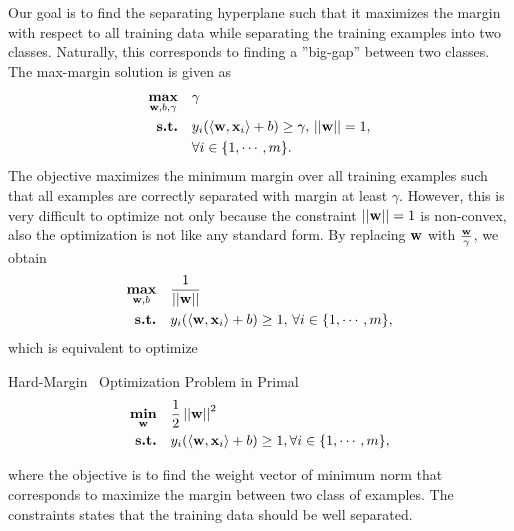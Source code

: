 Our goal is to find the separating hyperplane such that it maximizes the margin with respect to all training data while separating the training examples into two classes.
Naturally, this corresponds to finding a ''big-gap'' between two classes.
The max-margin solution is given as \citep{Bishop07}
\begin{align*}
	\underset{\mathbf {w},b,\gamma}{\textbf{max}} &\quad \gamma\\
	\textbf{s.t.} &\quad y_i(\langle \mathbf {w}, \mathbf {x}_i \rangle+b) \ge \gamma, \, \left|\left| \mathbf {w} \right|\right|=1,\\
	 &\quad \forall i\in\{1,\cdots,m\}.
\end{align*}
The objective maximizes the minimum margin over all training examples such that all examples are correctly separated with margin at least $\gamma$.
However, this is very difficult to optimize not only because the constraint $\left|\left| \mathbf {w} \right|\right|=1$ is non-convex, also the optimization is not like any standard form.
By replacing $\mathbf {w}$ with $\frac{\mathbf {w}}{\gamma}$, we obtain 
\begin{align*}
	\underset{\mathbf {w},b}{\textbf{max}} &\quad \frac{1}{\left|\left| \mathbf {w} \right|\right|}\\
	\textbf{s.t.} &\quad y_i(\langle \mathbf {w}, \mathbf {x}_i \rangle+b) \ge 1, \, \forall i\in\{1,\cdots,m\},
\end{align*}
which is equivalent to optimize
\begin{definition}{Hard-Margin \svm\ Optimization Problem in Primal}\label{hardsvmprimal}
	\begin{align*}
		\underset{\mathbf {w}}{\textbf{min}} & \quad\frac{1}{2}\left|\left| \mathbf {w} \right|\right|^2\\
		\textbf{s.t.} & \quad y_i(\langle \mathbf {w}, \mathbf {x}_i \rangle + b) \ge 1, \forall i\in\{1,\cdots,m\},
	\end{align*}
\end{definition}
where the objective is to find the weight vector of minimum norm that corresponds to maximize the margin between two class of examples.
The constraints states that the training data should be well separated.

